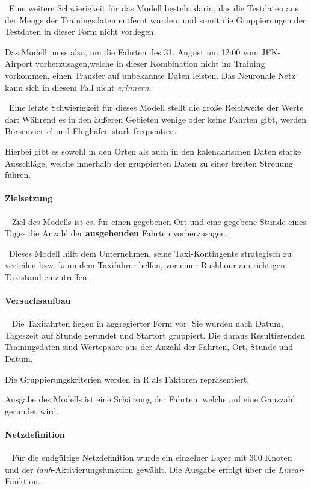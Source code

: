 ~\newline Eine weitere Schwierigkeit für das Modell besteht darin, das die Testdaten aus der Menge der Trainingsdaten entfernt wurden, und somit die Gruppierungen der Testdaten in dieser Form nicht vorliegen. 

Das Modell muss also, um die Fahrten des 31. August um 12:00 vom JFK-Airport vorherzusagen,welche in dieser Kombination nicht im Training vorkommen, einen Transfer auf unbekannte Daten leisten. Das Neuronale Netz kann sich in diesem Fall nicht \textit{erinnern}.

~\newline Eine letzte Schwierigkeit für dieses Modell stellt die große Reichweite der Werte dar: Während es in den äußeren Gebieten wenige oder keine Fahrten gibt, werden Börsenviertel und Flughäfen stark frequentiert. 

Hierbei gibt es sowohl in den Orten als auch in den kalendarischen Daten starke Ausschläge, welche innerhalb der gruppierten Daten zu einer breiten Streuung führen.
\paragraph{Zielsetzung} ~\newline
Ziel des Modells ist es, für einen gegebenen Ort und eine gegebene Stunde eines Tages die Anzahl der \textbf{ausgehenden} Fahrten vorherzusagen. 

~\newline Dieses Modell hilft dem Unternehmen, seine Taxi-Kontingente strategisch zu verteilen bzw. kann dem Taxifahrer helfen, vor einer Rushhour am richtigen Taxistand einzutreffen. 
\paragraph{Versuchsaufbau} ~\newline
Die Taxifahrten liegen in aggregierter Form vor: Sie wurden nach Datum, Tageszeit auf Stunde gerundet und Startort gruppiert. Die daraus Resultierenden Trainingsdaten sind Wertepaare aus der Anzahl der Fahrten, Ort, Stunde und Datum. 

Die Gruppierungskriterien werden in R als Faktoren repräsentiert. 

Ausgabe des Modells ist eine Schätzung der Fahrten, welche auf eine Ganzzahl gerundet wird. 

\paragraph{Netzdefinition} ~\newline
Für die endgültige Netzdefinition wurde ein einzelner Layer mit 300 Knoten und der \textit{tanh}-Aktivierungsfunktion gewählt. Die Ausgabe erfolgt über die \textit{Linear}-Funktion.


